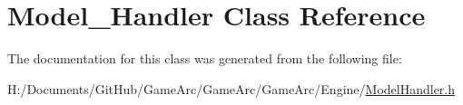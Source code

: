 \hypertarget{class_model___handler}{\section{Model\+\_\+\+Handler Class Reference}
\label{class_model___handler}
}


The documentation for this class was generated from the following file\+:\begin{DoxyCompactItemize}
\item 
H\+:/\+Documents/\+Git\+Hub/\+Game\+Arc/\+Game\+Arc/\+Game\+Arc/\+Engine/\hyperlink{_model_handler_8h}{Model\+Handler.\+h}\end{DoxyCompactItemize}
